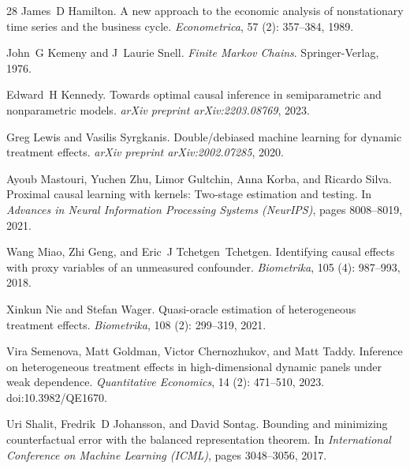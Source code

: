 \documentclass[twoside]{article}
\theoremstyle{definition}
\begin{document}
\begin{thebibliography}{28}
James~D Hamilton.
\newblock A new approach to the economic analysis of nonstationary time series and the business cycle.
\newblock \emph{Econometrica}, 57 (2): 357--384, 1989.

John~G Kemeny and J~Laurie Snell.
\newblock \emph{Finite Markov Chains}.
\newblock Springer-Verlag, 1976.

Edward~H Kennedy.
\newblock Towards optimal causal inference in semiparametric and nonparametric models.
\newblock \emph{arXiv preprint arXiv:2203.08769}, 2023.

Greg Lewis and Vasilis Syrgkanis.
\newblock Double/debiased machine learning for dynamic treatment effects.
\newblock \emph{arXiv preprint arXiv:2002.07285}, 2020.

Ayoub Mastouri, Yuchen Zhu, Limor Gultchin, Anna Korba, and Ricardo Silva.
\newblock Proximal causal learning with kernels: Two-stage estimation and testing.
\newblock In \emph{Advances in Neural Information Processing Systems (NeurIPS)}, pages 8008--8019, 2021.

Wang Miao, Zhi Geng, and Eric~J Tchetgen~Tchetgen.
\newblock Identifying causal effects with proxy variables of an unmeasured confounder.
\newblock \emph{Biometrika}, 105 (4): 987--993, 2018.

Xinkun Nie and Stefan Wager.
\newblock Quasi-oracle estimation of heterogeneous treatment effects.
\newblock \emph{Biometrika}, 108 (2): 299--319, 2021.

Vira Semenova, Matt Goldman, Victor Chernozhukov, and Matt Taddy.
\newblock Inference on heterogeneous treatment effects in high-dimensional dynamic panels under weak dependence.
\newblock \emph{Quantitative Economics}, 14 (2): 471--510, 2023.
\newblock doi:10.3982/QE1670.

Uri Shalit, Fredrik~D Johansson, and David Sontag.
\newblock Bounding and minimizing counterfactual error with the balanced representation theorem.
\newblock In \emph{International Conference on Machine Learning (ICML)}, pages 3048--3056, 2017.


\end{thebibliography}
\end{document}
